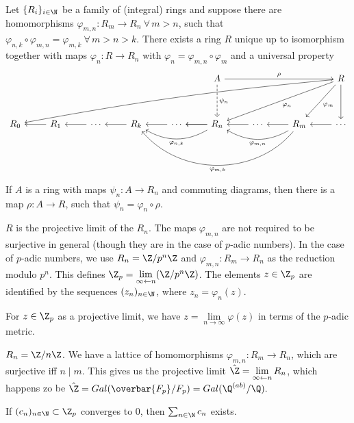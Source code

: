 \documentclass{jvfscript}
\begin{document}
	\begin{defn}
		Let $ \{R_i\}_{i \in \N} $ be a family of (integral) rings and suppose there are homomorphisms $ \varphi_{m,n}: R_m \to R_n \ \forall\, m > n $, such that $ \varphi_{n,k} \circ \varphi_{m,n} = \varphi_{m,k} \ \forall\, m>n>k $. There exists a ring $R$ unique up to isomorphism together with maps $ \varphi_n: R \to R_n $ with $ \varphi_n = \varphi_{m,n} \circ \varphi_m $ and a universal property
		\[ \begin{tikzcd}
			&&&&&A \arrow[dd,dashed,"\psi_n"] \arrow[rrr,"\rho"] &&&R \arrow[dd] \arrow[ddl,"\varphi_m"] \arrow[ddlll,"\varphi_n"] \arrow[ddllllllll, bend right = 2.5] \\
			\\
			R_0 & R_1 \arrow[l] & \cdots \arrow{l} & R_k \arrow[l] & \cdots \arrow{l} & R_n \arrow{l} \arrow{l}\arrow[ll,bend left, "\varphi_{n,k}"] & \cdots \arrow{l} & R_m \arrow{l} \arrow[ll,bend left, "\varphi_{m,n}"] \arrow[llll,bend left=50, "\varphi_{m,k}"] & \cdots \arrow{l}
		\end{tikzcd} \]
		If $A$ is a ring with maps $ \psi_n: A \to R_n $ and commuting diagrams, then there is a map $ \rho: A \to R $, such that $ \psi_n = \varphi_n \circ \rho $.
	\end{defn}
	$R$ is the projective limit of the $R_n$. The maps $ \varphi_{m,n} $ are not required to be surjective in general (though they are in the case of $p$-adic numbers). In the case of $p$-adic numbers, we use $ R_n = \Z/p^n\Z $ and $ \varphi_{m,n}: R_m \to R_n $ as the reduction modulo $p^n$. This defines $\Z_p = \lim\limits_{\infty \leftarrow n} (\Z/p^n\Z)$. The elements $ z \in \Z_p $ are identified by the sequences $ (z_n)_{n \in \N} $, where $ z_n = \varphi_n (z). $
	
	\begin{rem}
		For $ z \in \Z_p $ as a projective limit, we have $ z = \lim\limits_{n \to \infty} \varphi(z) $ in terms of the $p$-adic metric.
	\end{rem}
	
	\begin{exmp}
		$ R_n = \Z/n\Z $. We have a lattice of homomorphisms $ \varphi_{m,n}: R_m \to R_n $, which are surjective iff $n \mid m$. This gives us the projective limit $ \hat{\Z} = \lim\limits_{\infty \leftarrow n} R_n $, which happens zo be $ \hat{\Z} = Gal(\overbar{F_p}/F_p) = Gal(\Q^{(ab)}/\Q). $
	\end{exmp}

	\begin{lem}
		If $ (c_n)_{n \in \N} \subset \Z_p $ converges to $0$, then $ \sum_{n \in \N} c_n $ exists.
	\end{lem}
	
\end{document}
